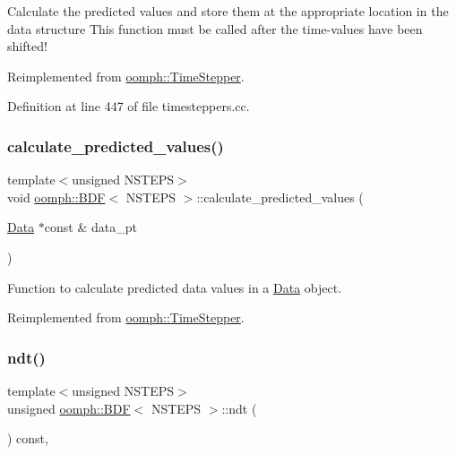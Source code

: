 Calculate the predicted values and store them at the appropriate location in the data structure This function must be called after the time-\/values have been shifted! 

Reimplemented from \hyperlink{classoomph_1_1TimeStepper_a159d508b1ae643fe31b55da9ee789dbf}{oomph\+::\+Time\+Stepper}.



Definition at line 447 of file timesteppers.\+cc.

\mbox{\label{classoomph_1_1BDF_a4c3da151a405c2041103cb2795c3ff95}} 
\subsubsection{\texorpdfstring{calculate\+\_\+predicted\+\_\+values()}{calculate\_predicted\_values()}\hspace{0.1cm}{\footnotesize\ttfamily [4/4]}}
{\footnotesize\ttfamily template$<$unsigned N\+S\+T\+E\+PS$>$ \\
void \hyperlink{classoomph_1_1BDF}{oomph\+::\+B\+DF}$<$ N\+S\+T\+E\+PS $>$\+::calculate\+\_\+predicted\+\_\+values (\begin{DoxyParamCaption}\item[{\hyperlink{classoomph_1_1Data}{Data} $\ast$const \&}]{data\+\_\+pt }\end{DoxyParamCaption})\hspace{0.3cm}{\ttfamily [virtual]}}



Function to calculate predicted data values in a \hyperlink{classoomph_1_1Data}{Data} object. 



Reimplemented from \hyperlink{classoomph_1_1TimeStepper_a159d508b1ae643fe31b55da9ee789dbf}{oomph\+::\+Time\+Stepper}.

\mbox{\label{classoomph_1_1BDF_a6bfaedcd81cad549615bd21ce4336421}} 
\subsubsection{\texorpdfstring{ndt()}{ndt()}}
{\footnotesize\ttfamily template$<$unsigned N\+S\+T\+E\+PS$>$ \\
unsigned \hyperlink{classoomph_1_1BDF}{oomph\+::\+B\+DF}$<$ N\+S\+T\+E\+PS $>$\+::ndt (\begin{DoxyParamCaption}{ }\end{DoxyParamCaption}) const\hspace{0.3cm}{\ttfamily [inline]}, {\ttfamily [virtual]}}



